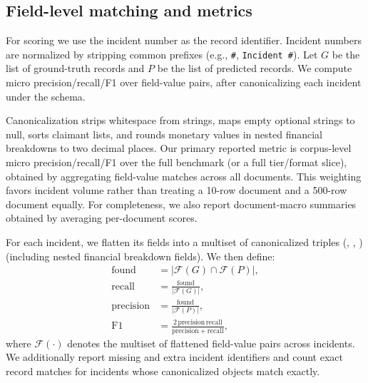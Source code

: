 \subsection{Field-level matching and metrics}
For scoring we use the incident number as the record identifier. Incident numbers are normalized by stripping common prefixes (e.g., \texttt{\#}, \texttt{Incident \#}). Let $G$ be the list of ground-truth records and $P$ be the list of predicted records. We compute micro precision/recall/F1 over field-value pairs, after canonicalizing each incident under the schema.

Canonicalization strips whitespace from strings, maps empty optional strings to null, sorts claimant lists, and rounds monetary values in nested financial breakdowns to two decimal places. Our primary reported metric is corpus-level micro precision/recall/F1 over the full benchmark (or a full tier/format slice), obtained by aggregating field-value matches across all documents. This weighting favors incident volume rather than treating a 10-row document and a 500-row document equally. For completeness, we also report document-macro summaries obtained by averaging per-document scores.

For each incident, we flatten its fields into a multiset of canonicalized triples (, , ) (including nested financial breakdown fields). We then define:
\begin{align}
\mathrm{found} &= |\mathcal{F}(G) \cap \mathcal{F}(P)|,\\
\mathrm{recall} &= \frac{\mathrm{found}}{|\mathcal{F}(G)|},\\
\mathrm{precision} &= \frac{\mathrm{found}}{|\mathcal{F}(P)|},\\
\mathrm{F1} &= \frac{2\,\mathrm{precision}\,\mathrm{recall}}{\mathrm{precision}+\mathrm{recall}},
\end{align}
where $\mathcal{F}(\cdot)$ denotes the multiset of flattened field-value pairs across incidents. We additionally report missing and extra incident identifiers and count exact record matches for incidents whose canonicalized objects match exactly.
%
